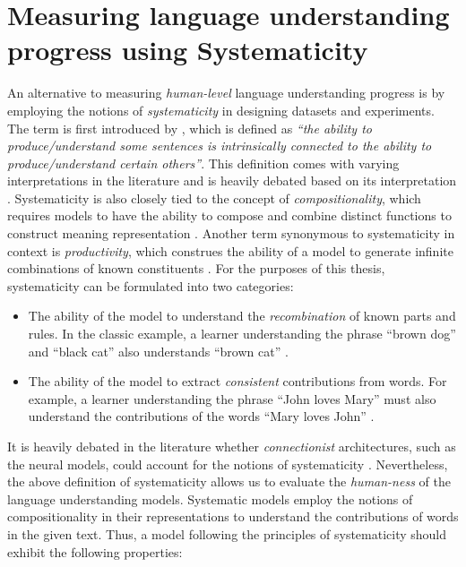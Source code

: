 \documentclass[letterpaper, 12pt]{report}
\begin{document}
\section{Measuring language understanding progress using Systematicity}
\label{sec:bg_systematicity}

An alternative to measuring \textit{human-level} language understanding progress is by employing the notions of \textit{systematicity} in designing datasets and experiments.
The term is first introduced by \citet{fodor1988connectionism}, which is defined as \textit{``the ability to produce/understand some sentences is intrinsically connected to the ability to produce/understand certain others''}. This definition comes with varying interpretations in the literature \citep{lake2018generalization,bahdanau2018systematic, goodwin-etal-2020-probing} and is heavily debated based on its interpretation \citep{szabo2012case,herbelot2020how}. Systematicity is also closely tied to the concept of \textit{compositionality}, which requires models to have the ability to compose and combine distinct functions to construct meaning representation \citep{kratzer1998semantics,szabo2012case}. Another term synonymous to systematicity in context is \textit{productivity}, which construes the ability of a model to generate infinite combinations of known constituents \citep{pullum2010recursion}.
For the purposes of this thesis, systematicity can be formulated into two categories:

\begin{itemize}
  \item The ability of the model to understand the \textit{recombination} of known parts and rules. In the classic example, a learner understanding the phrase ``brown dog'' and ``black cat'' also understands ``brown cat'' \citep{hupkes2020}.
  \item The ability of the model to extract \textit{consistent} contributions from words. For example, a learner understanding the phrase ``John loves Mary'' must also understand the contributions of the words ``Mary loves John'' \citep{goodwin-etal-2020-probing}.
\end{itemize}

It is heavily debated in the literature whether \textit{connectionist} architectures, such as the neural models, could account for the notions of systematicity \citep{fodor1988connectionism, smolensky1991constituent, marcus1998rethinking}. Nevertheless, the above definition of systematicity allows us to evaluate the \textit{human-ness} of the language understanding models. Systematic models employ the notions of compositionality in their representations to understand the contributions of words in the given text. Thus, a model following the principles of systematicity should exhibit the following properties:
\end{document}

